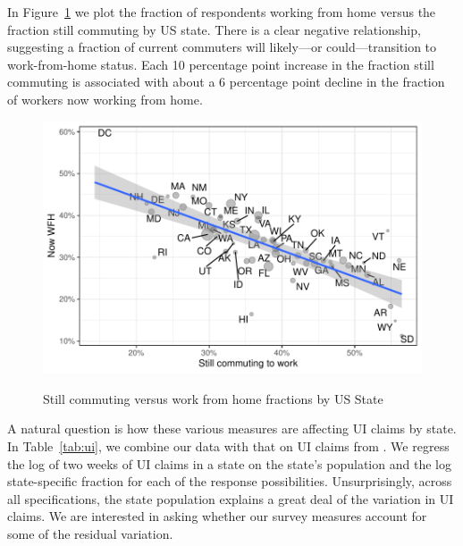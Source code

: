 \documentclass[12pt]{article}
\begin{document}
In Figure~\ref{fig:commute_vs_wfh} we plot the fraction of respondents working from home versus the fraction still commuting by US state.
There is a clear negative relationship, suggesting a fraction of current commuters will likely---or could---transition to work-from-home status.
Each 10 percentage point increase in the fraction still commuting is associated with about a 6 percentage point decline in the fraction of workers now working from home. 

\begin{figure}
  \caption{Still commuting versus work from home fractions by US State} \label{fig:commute_vs_wfh}
\centering
\begin{minipage}{0.8 \linewidth}
  \includegraphics[width = \linewidth]{plots/commute_vs_wfh.pdf} \\
  \begin{footnotesize}
    \end{footnotesize}
\end{minipage}
\end{figure} 

A natural question is how these various measures are affecting UI claims by state. 
In Table~\ref{tab:ui}, we combine our data with that on UI claims from \cite{goldsmith2020}.
We regress the log of two weeks of UI claims in a state on the state's population and the log state-specific fraction for each of the response possibilities.  
Unsurprisingly, across all specifications, the state population explains a great deal of the variation in UI claims.
We are interested in asking whether our survey measures account for some of the residual variation.
\end{document}
